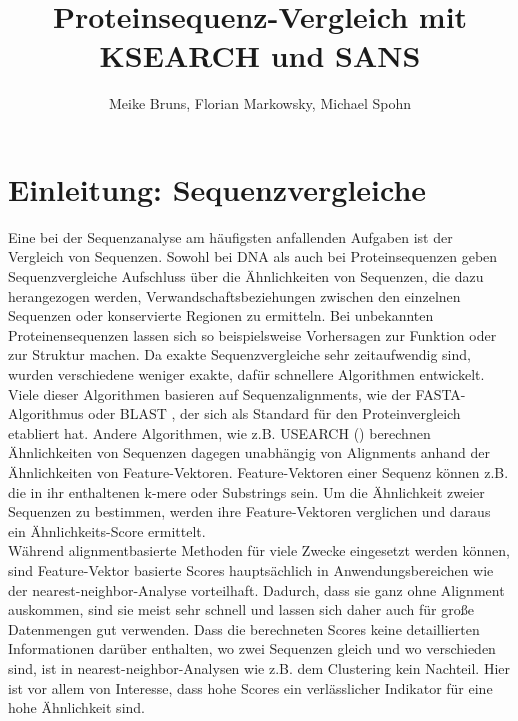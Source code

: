 \documentclass{article}
\title{Proteinsequenz-Vergleich mit KSEARCH und SANS}
\author{Meike Bruns, Florian Markowsky, Michael Spohn}
\begin{document}
\maketitle
\thispagestyle{empty}
\begin{abstract}
\end{abstract}
\newpage

\tableofcontents
\thispagestyle{empty}
\newpage

\section{Einleitung: Sequenzvergleiche}

Eine bei der Sequenzanalyse am häufigsten anfallenden Aufgaben ist der Vergleich
von Sequenzen. 
Sowohl bei DNA als auch bei Proteinsequenzen geben Sequenzvergleiche Aufschluss über die Ähnlichkeiten von Sequenzen, die dazu herangezogen werden, Verwandschaftsbeziehungen zwischen den einzelnen Sequenzen oder konservierte Regionen zu ermitteln. Bei unbekannten Proteinensequenzen lassen sich so beispielsweise Vorhersagen zur Funktion oder zur Struktur machen. Da exakte Sequenzvergleiche sehr zeitaufwendig sind, wurden verschiedene weniger exakte, dafür schnellere Algorithmen entwickelt.\\
Viele dieser Algorithmen basieren auf Sequenzalignments, wie der FASTA-Algorithmus \cite{FASTA} oder BLAST \cite{BLAST}, der sich als Standard für den Proteinvergleich etabliert hat.
Andere Algorithmen, wie z.B. USEARCH (\cite{USEARCH}) berechnen Ähnlichkeiten von Sequenzen dagegen unabhängig von Alignments anhand der Ähnlichkeiten von Feature-Vektoren. 
Feature-Vektoren einer Sequenz können z.B. die in ihr enthaltenen k-mere oder Substrings sein. 
Um die Ähnlichkeit zweier Sequenzen zu bestimmen, werden ihre Feature-Vektoren verglichen und daraus ein Ähnlichkeits-Score ermittelt.\\
Während alignmentbasierte Methoden für viele Zwecke eingesetzt werden können, sind Feature-Vektor basierte Scores hauptsächlich in Anwendungsbereichen wie der nearest-neighbor-Analyse vorteilhaft. 
Dadurch, dass sie ganz ohne Alignment auskommen, sind sie meist sehr schnell und lassen sich daher auch für große Datenmengen gut verwenden. 
Dass die berechneten Scores keine detaillierten Informationen darüber enthalten,
wo zwei Sequenzen gleich und wo verschieden sind, ist in nearest-neighbor-Analysen wie z.B. dem Clustering kein Nachteil. 
Hier ist vor allem von Interesse, dass hohe Scores ein verlässlicher Indikator für eine hohe Ähnlichkeit sind.\\
\end{document}
